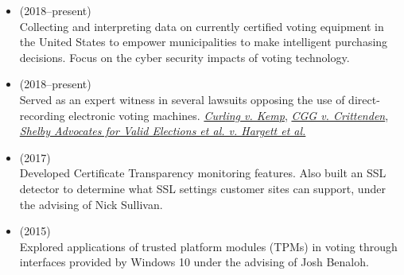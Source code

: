 \documentclass[11pt]{article}
\begin{document}

\begin{itemize}[label={--\ },leftmargin=0.25in,labelsep=0.1625em]
\addtolength{\itemsep}{-0.25\baselineskip}

\item{} (2018--present)\\
{\small Collecting and interpreting data on currently certified voting equipment in the United States to empower municipalities to make intelligent purchasing decisions. Focus on the cyber security impacts of voting technology.}

\item{} (2018--present)\\
{\small Served as an expert witness in several lawsuits opposing the use of direct-recording electronic voting machines. {\it \href{https://www.theroot.com/brian-kemp-doesnt-need-to-rig-georgias-election-beca-1830233656}{Curling v. Kemp}}, {\it \href{https://www.apnews.com/b3e8f250f50244478ae3bbf19399f6ff}{CGG v. Crittenden}}, {\it {\href{https://www.pacermonitor.com/public/case/25902838/Shelby_Advocates_for_Valid_Elections_et_al_v_Hargett_et_al}{Shelby Advocates for Valid Elections et al. v. Hargett et al.}}}}

\item{} (2017)\\
{\small Developed Certificate Transparency monitoring features. Also built an SSL detector to determine what SSL settings customer sites can support, under the advising of Nick Sullivan.}

\item{} (2015)\\
{\small Explored applications of trusted platform modules (TPMs) in voting through interfaces provided by Windows 10 under the advising of Josh Benaloh.}

\end{itemize}
\end{document}
